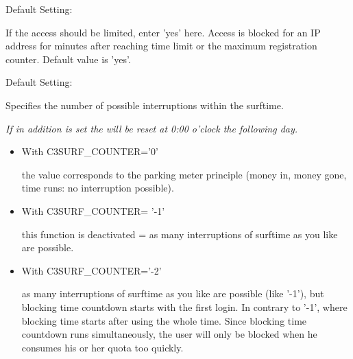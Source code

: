 \begin{itemize}
\begin{description}

  Default Setting: 

  If the access should be limited, enter 'yes' here. Access is blocked for an IP
  address for  minutes after
  reaching time limit or the maximum registration counter. Default value is 'yes'.



  Default Setting: 

  Specifies the number of possible interruptions within the
  surftime.


  \emph{If in addition  is set the
   will be reset at 0:00 o'clock the following day.}

  \begin{itemize}
    \item{With C3SURF\_COUNTER='0'}

    the value corresponds to the parking meter principle (money in, money gone, time runs: no interruption
    possible).

    \item{With C3SURF\_COUNTER= '-1'}

    this function is deactivated = as many interruptions of surftime as you like are possible.

    \item{With C3SURF\_COUNTER='-2'}

    as many interruptions of surftime as you like are possible (like '-1'), but blocking time countdown
    starts with the first login. In contrary to '-1', where blocking time starts after using the whole time.
    Since blocking time countdown runs simultaneously, the user will only be blocked when he consumes his
    or her quota too quickly.


\end{itemize}
\end{description}
\end{itemize}

